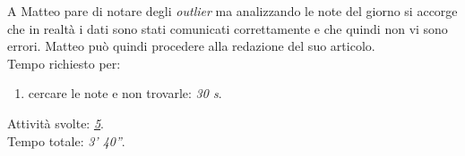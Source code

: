 \noindent
A Matteo pare di notare degli \textit{outlier} ma analizzando le note del giorno si accorge che in realtà i dati sono stati comunicati correttamente e che quindi non vi sono errori. Matteo può quindi procedere alla redazione del suo articolo.\\
Tempo richiesto per:
\begin{enumerate}
    \item cercare le note e non trovarle: \textit{30 s}.
\end{enumerate}

\noindent
Attività svolte: \hyperref[itm:5]{\textit{5}}.\\  
Tempo totale: \textit{3' 40''}. 